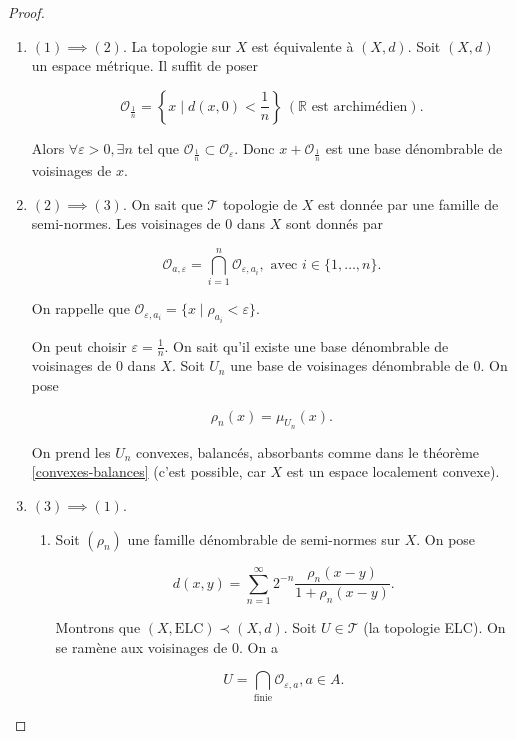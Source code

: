 \documentclass[french]{book}
\theoremstyle{definition}
\theoremstyle{remark}
\newcommand{\lesss}{<}
\newcommand{\less}{\lesss}
\newcommand{\biggg}{>}
\newcommand{\bg}{\biggg}
\begin{document}
\begin{proof}
  \begin{enumerate}
    \item \((1) \implies (2)\). La topologie sur \(X\) est équivalente à \((X,d)\). Soit \((X,d)\) un espace métrique. Il suffit de poser

    \[\mathcal{O} _{\frac{1}{n}} = \left\{ x \mid d(x,0) \less \frac{1}{n}\right\} \ (\mathbb{R} \text{ est archimédien}). \]

    Alors \(\forall \varepsilon \bg 0, \exists n \text{ tel que } \mathcal{O} _{\frac{1}{n}} \subset \mathcal{O} _{\varepsilon}\). Donc \(x + \mathcal{O} _{\frac{1}{n}}\) est une base dénombrable de voisinages de \(x\).

    \item \((2) \implies (3)\). On sait que \(\mathscr{T}\) topologie de \(X\) est donnée par une famille de semi-normes. Les voisinages de 0 dans \(X\) sont donnés par

    \[\mathcal{O} _{a, \varepsilon} = \bigcap _{i=1} ^{n} \mathcal{O} _{\varepsilon, a_i}, \text{ avec } i \in \{ 1, \dots, n \}.\]

    On rappelle que \(\mathcal{O} _{\varepsilon,a_i} = \{ x \mid \rho _{a_i} \less \varepsilon \}\).

    On peut choisir \(\varepsilon = \frac{1}{n}\). On sait qu'il existe une base dénombrable de voisinages de 0 dans \(X\). Soit \(U_n\) une base de voisinages dénombrable de 0. On pose

    \[\rho_n(x) = \mu _{U_n}(x).\]

    On prend les \(U_n\) convexes, balancés, absorbants comme dans le théorème \ref{convexes-balances} (c'est possible, car \(X\) est un espace localement convexe).

    \item \((3) \implies (1)\).

    \begin{enumerate}
      \item Soit \( (\rho_n)\) une famille dénombrable de semi-normes sur \(X\). On pose

      \[d(x,y) = \sum_{n=1}^{\infty} 2 ^{-n} \frac{\rho_n(x-y)}{1 + \rho_n(x-y)}.\]

      Montrons que \((X, \text{ELC}) \prec (X, d)\). Soit \(U \in \mathscr{T}\) (la topologie ELC). On se ramène aux voisinages de 0. On a

      \[U = \bigcap _{\text{finie}} \mathcal{O} _{\varepsilon, a}, a \in A. \]


\end{enumerate}
\end{enumerate}
\end{proof}
\end{document}
